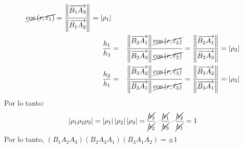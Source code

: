 \begin{solucion}
\begin{eqnarray*}
{  \cancel{ \cos\left( r, \ell_1 \right) }
  }
  =
  \frac{
  \left\lVert \overrightarrow{B_1A_3} \right\rVert
  }{
  \left\lVert \overrightarrow{B_1A_2} \right\rVert
  }
  = \lvert \rho_1 \rvert
  \\
  \frac{h_1}{h_3} & = &
  \frac{
  \left\lVert \overrightarrow{B_2A_1} \right\rVert
  \cancel{ \cos\left( r, \ell_2 \right) }
  }{
  \left\lVert \overrightarrow{B_2A_3} \right\rVert
  \cancel{ \cos\left( r, \ell_2 \right) }
  }
  =
  \frac{
  \left\lVert \overrightarrow{B_2A_1} \right\rVert
  }{
  \left\lVert \overrightarrow{B_2A_3} \right\rVert
  }
  = \lvert \rho_2 \rvert
  \\
  \frac{h_2}{h_1} & = &
  \frac{
  \left\lVert \overrightarrow{B_3A_2} \right\rVert
  \cancel{ \cos\left( r, \ell_3 \right) }
  }{
  \left\lVert \overrightarrow{B_3A_1} \right\rVert
  \cancel{ \cos\left( r, \ell_3 \right) }
  }
  =
  \frac{
  \left\lVert \overrightarrow{B_3A_2} \right\rVert
  }{
  \left\lVert \overrightarrow{B_3A_1} \right\rVert
  }
  = \lvert \rho_3 \rvert
 \end{eqnarray*}
 Por lo tanto:
 \begin{equation*}
  \left\lvert \rho_1 \rho_2 \rho_3 \right\rvert
  = 
  \left\lvert \rho_1 \right\rvert
  \left\lvert \rho_2 \right\rvert
  \left\lvert \rho_3 \right\rvert
  = \frac{\cancel{h_3}}{\cancel{h_2}} \cdot
  \frac{\cancel{h_1}}{\cancel{h_3}} \cdot \frac{\cancel{h_2}}{\cancel{h_1}}
  = 1
 \end{equation*}
 Por lo tanto,
 $\left( B_1A_2A_3 \right)\left( B_2A_3A_1 \right)\left( B_3A_1A_2 \right) = \pm 1$
\end{solucion}
